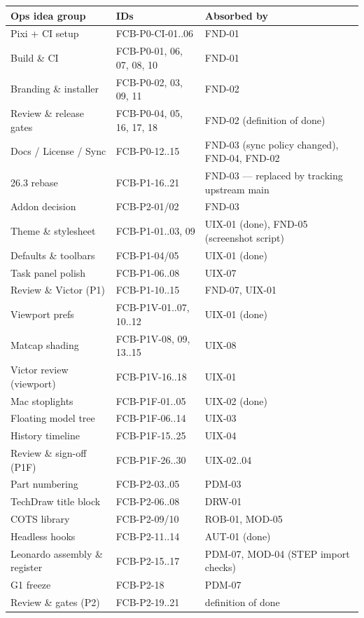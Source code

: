 \begin{center}
\small
\begin{longtable}{@{}p{4.6cm}p{4.2cm}p{6.6cm}@{}}
\toprule
Ops idea group & IDs & Absorbed by\\
\midrule\endhead
\bottomrule\endfoot
Pixi + CI setup & FCB-P0-CI-01..06 & FND-01\\
Build \& CI & FCB-P0-01, 06, 07, 08, 10 & FND-01\\
Branding \& installer & FCB-P0-02, 03, 09, 11 & FND-02\\
Review \& release gates & FCB-P0-04, 05, 16, 17, 18 & FND-02 (definition of done)\\
Docs / License / Sync & FCB-P0-12..15 & FND-03 (sync policy changed), FND-04, FND-02\\
26.3 rebase & FCB-P1-16..21 & FND-03 --- replaced by tracking upstream main\\
Addon decision & FCB-P2-01/02 & FND-03\\
Theme \& stylesheet & FCB-P1-01..03, 09 & UIX-01 (done), FND-05 (screenshot script)\\
Defaults \& toolbars & FCB-P1-04/05 & UIX-01 (done)\\
Task panel polish & FCB-P1-06..08 & UIX-07\\
Review \& Victor (P1) & FCB-P1-10..15 & FND-07, UIX-01\\
Viewport prefs & FCB-P1V-01..07, 10..12 & UIX-01 (done)\\
Matcap shading & FCB-P1V-08, 09, 13..15 & UIX-08\\
Victor review (viewport) & FCB-P1V-16..18 & UIX-01\\
Mac stoplights & FCB-P1F-01..05 & UIX-02 (done)\\
Floating model tree & FCB-P1F-06..14 & UIX-03\\
History timeline & FCB-P1F-15..25 & UIX-04\\
Review \& sign-off (P1F) & FCB-P1F-26..30 & UIX-02..04\\
Part numbering & FCB-P2-03..05 & PDM-03\\
TechDraw title block & FCB-P2-06..08 & DRW-01\\
COTS library & FCB-P2-09/10 & ROB-01, MOD-05\\
Headless hooks & FCB-P2-11..14 & AUT-01 (done)\\
Leonardo assembly \& register & FCB-P2-15..17 & PDM-07, MOD-04 (STEP import checks)\\
G1 freeze & FCB-P2-18 & PDM-07\\
Review \& gates (P2) & FCB-P2-19..21 & definition of done\\

\end{longtable}
\end{center}
